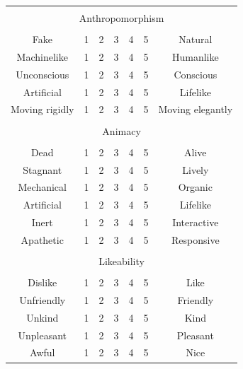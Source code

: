 \begin{table}[H]
    \begin{center}
    	\begin{tabular}{|c|c|c|c|c|c|c|}
    		\hline
            \multicolumn{7}{|c|}{ } \\[-1em]
    		\multicolumn{7}{|c|}{Anthropomorphism} \\[-1em]
            \multicolumn{7}{|c|}{ } \\
    		Fake			& 1 & 2 & 3 & 4 & 5 & 	Natural \\
    		Machinelike		& 1 & 2 & 3 & 4 & 5 & 	Humanlike \\
    		Unconscious		& 1 & 2 & 3 & 4 & 5 & 	Conscious \\
    		Artificial		& 1 & 2 & 3 & 4 & 5 & 	Lifelike \\
    		Moving rigidly	& 1 & 2 & 3 & 4 & 5 & 	Moving elegantly \\
            \hline
            \multicolumn{7}{|c|}{ } \\[-1em]
    		\multicolumn{7}{|c|}{Animacy} \\[-1em]
            \multicolumn{7}{|c|}{ } \\
    		Dead			& 1 & 2 & 3 & 4 & 5 & 	Alive \\
    		Stagnant		& 1 & 2 & 3 & 4 & 5 & 	Lively \\
    		Mechanical		& 1 & 2 & 3 & 4 & 5 & 	Organic \\
    		Artificial		& 1 & 2 & 3 & 4 & 5 & 	Lifelike \\
    		Inert			& 1 & 2 & 3 & 4 & 5 & 	Interactive \\
    		Apathetic		& 1 & 2 & 3 & 4 & 5 & 	Responsive \\
            \hline
            \multicolumn{7}{|c|}{ } \\[-1em]
    		\multicolumn{7}{|c|}{Likeability} \\[-1em]
            \multicolumn{7}{|c|}{ } \\
    		Dislike			& 1 & 2 & 3 & 4 & 5 & 	Like \\
    		Unfriendly		& 1 & 2 & 3 & 4 & 5 & 	Friendly \\
    		Unkind			& 1 & 2 & 3 & 4 & 5 & 	Kind \\
    		Unpleasant		& 1 & 2 & 3 & 4 & 5 & 	Pleasant \\
    		Awful			& 1 & 2 & 3 & 4 & 5 & 	Nice \\

\end{tabular}
\end{center}
\end{table}
